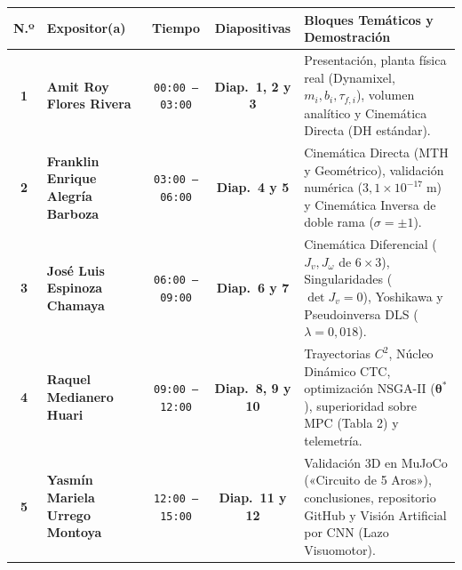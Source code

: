 \documentclass[11pt,a4paper]{article}
\begin{document}
\begin{center}
\small
\renewcommand{\arraystretch}{1.20}
\begin{tabularx}{\textwidth}{c l c c X}
\toprule
\textbf{N.º} & \textbf{Expositor(a)} & \textbf{Tiempo} & \textbf{Diapositivas} & \textbf{Bloques Temáticos y Demostración} \\
\midrule
\textbf{1} & \textbf{Amit Roy Flores Rivera} & \texttt{00:00 -- 03:00} & \textbf{Diap.\ 1, 2 y 3} & Presentación, planta física real (Dynamixel, $m_i, b_i, \tau_{f,i}$), volumen analítico y Cinemática Directa (DH estándar). \\
\textbf{2} & \textbf{Franklin Enrique Alegría Barboza} & \texttt{03:00 -- 06:00} & \textbf{Diap.\ 4 y 5} & Cinemática Directa (MTH y Geométrico), validación numérica ($3{,}1\times 10^{-17}\;\text{m}$) y Cinemática Inversa de doble rama ($\sigma=\pm 1$). \\
\textbf{3} & \textbf{José Luis Espinoza Chamaya} & \texttt{06:00 -- 09:00} & \textbf{Diap.\ 6 y 7} & Cinemática Diferencial ($J_v, J_\omega$ de $6\times 3$), Singularidades ($\det J_v=0$), Yoshikawa y Pseudoinversa DLS ($\lambda=0{,}018$). \\
\textbf{4} & \textbf{Raquel Medianero Huari} & \texttt{09:00 -- 12:00} & \textbf{Diap.\ 8, 9 y 10} & Trayectorias $C^2$, Núcleo Dinámico CTC, optimización NSGA-II ($\bm{\theta}^*$), superioridad sobre MPC (Tabla 2) y telemetría. \\
\textbf{5} & \textbf{Yasmín Mariela Urrego Montoya} & \texttt{12:00 -- 15:00} & \textbf{Diap.\ 11 y 12} & Validación 3D en MuJoCo («Circuito de 5 Aros»), conclusiones, repositorio GitHub y Visión Artificial por CNN (Lazo Visuomotor). \\
\bottomrule
\end{tabularx}
\end{center}

\vspace{1mm}
\end{document}
